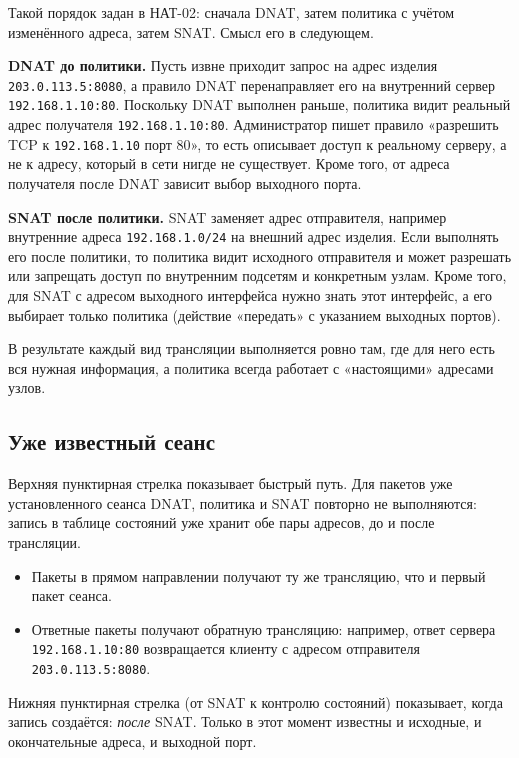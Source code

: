 \documentclass[12pt,a4paper,final]{article}
\begin{document}
Такой порядок задан в НАТ-02: сначала DNAT, затем политика с учётом
изменённого адреса, затем SNAT. Смысл его в следующем.

\textbf{DNAT до политики.} Пусть извне приходит запрос на адрес изделия
\texttt{203.0.113.5:8080}, а правило DNAT перенаправляет его на внутренний
сервер \texttt{192.168.1.10:80}. Поскольку DNAT выполнен раньше, политика
видит реальный адрес получателя \texttt{192.168.1.10:80}. Администратор
пишет правило «разрешить TCP к \texttt{192.168.1.10} порт 80», то есть
описывает доступ к реальному серверу, а не к адресу, который в сети
нигде не существует. Кроме того, от адреса получателя после DNAT зависит
выбор выходного порта.

\textbf{SNAT после политики.} SNAT заменяет адрес отправителя, например
внутренние адреса \texttt{192.168.1.0/24} на внешний адрес изделия. Если
выполнять его после политики, то политика видит исходного отправителя
и может разрешать или запрещать доступ по внутренним подсетям и
конкретным узлам. Кроме того, для SNAT с адресом выходного интерфейса нужно
знать этот интерфейс, а его выбирает только политика (действие
«передать» с указанием выходных портов).

В результате каждый вид трансляции выполняется ровно там, где для него есть
вся нужная информация, а политика всегда работает с «настоящими» адресами
узлов.

\subsection{Уже известный сеанс}

Верхняя пунктирная стрелка показывает быстрый путь. Для пакетов уже
установленного сеанса DNAT, политика и SNAT повторно не выполняются: запись
в таблице состояний уже хранит обе пары адресов, до и после трансляции.
\begin{itemize}
\item Пакеты в прямом направлении получают ту же трансляцию, что и первый
  пакет сеанса.
\item Ответные пакеты получают обратную трансляцию: например, ответ сервера
  \texttt{192.168.1.10:80} возвращается клиенту с адресом отправителя
  \texttt{203.0.113.5:8080}.
\end{itemize}

Нижняя пунктирная стрелка (от SNAT к контролю состояний) показывает, когда
запись создаётся: \emph{после} SNAT. Только в этот момент известны и исходные,
и окончательные адреса, и выходной порт.
\end{document}
